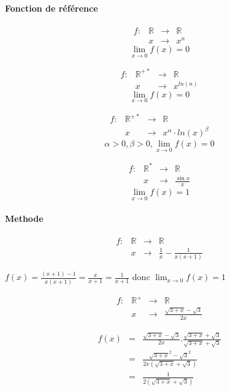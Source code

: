 \paragraph{Fonction de référence}
\[\begin{array}{rccl}
	f: &\mathbb{R} &\rightarrow &\mathbb{R} \\
	& x & \rightarrow &x^n 
\end{array}\]
\[\lim_{x \to 0} f(x) = 0\]


\[\begin{array}{rccl}
	f: &\mathbb{R}^{+*} &\rightarrow &\mathbb{R} \\
	   & x & \rightarrow &x^{ln(n)} 
\end{array}\]
\[\lim_{x \to 0} f(x) = 0\]

\[\begin{array}{rccl}
	f: &\mathbb{R}^{+*} &\rightarrow &\mathbb{R} \\
	   & x & \rightarrow &x^{\alpha} \cdot ln(x)^\beta
\end{array}\]
\[\alpha >0, \beta>0, \lim_{x \to 0} f(x) = 0\]

\[\begin{array}{rccl}
	f: &\mathbb{R}^* &\rightarrow &\mathbb{R} \\
	   & x & \rightarrow &\frac{\sin{x}}{x}
\end{array}\]
\[\lim_{x \to 0} f(x) = 1\]

\paragraph{Methode}
\[\begin{array}{rccl}
	f:&\mathbb{R} &\rightarrow &\mathbb{R}\\
	  &x& \rightarrow & \frac{1}{x} - \frac{1}{x(x+1)}
\end{array}\]

$f(x) = \frac{(x+1)-1}{x(x+1)} = \frac{x}{x+1} = \frac{1}{x+1}$
donc $\lim_{x \to 0}f(x) = 1$

\[\begin{array}{rccl}
	f:&\mathbb{R}^+ &\rightarrow &\mathbb{R}\\
	  &x& \rightarrow & \frac{\sqrt{3+x} - \sqrt{3}}{2x}
\end{array}\]

\[\begin{array}{rccl}
	f(x) &=& \frac{\sqrt{3+x} - \sqrt{3}}{2x} . \frac{\sqrt{3+x} + \sqrt{3}}{\sqrt{3+x} + \sqrt{3}} \\
			   &=& \frac{\sqrt{3+x}^2 - \sqrt{3}^2}{2x(\sqrt{3+x} + \sqrt{3})} \\
			   &=& \frac{1}{2(\sqrt{3+x}+\sqrt{3})}
\end{array}\]

